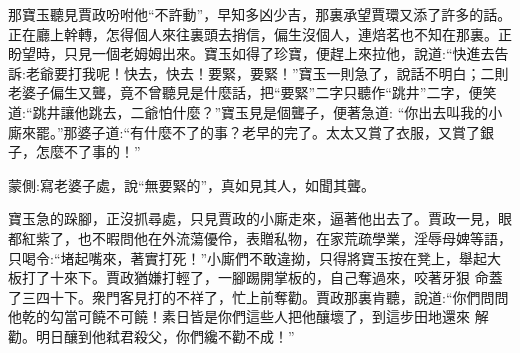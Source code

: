 \begin{parag}
    那寶玉聽見賈政吩咐他“不許動”，早知多凶少吉，那裏承望賈環又添了許多的話。正在廳上幹轉，怎得個人來往裏頭去捎信，偏生沒個人，連焙茗也不知在那裏。正盼望時，只見一個老姆姆出來。寶玉如得了珍寶，便趕上來拉他，說道:“快進去告訴:老爺要打我呢！快去，快去！要緊，要緊！”寶玉一則急了，說話不明白；二則老婆子偏生又聾，竟不曾聽見是什麼話，把“要緊”二字只聽作“跳井”二字，便笑道:“跳井讓他跳去，二爺怕什麼？”寶玉見是個聾子，便著急道: “你出去叫我的小廝來罷。”那婆子道:“有什麼不了的事？老早的完了。太太又賞了衣服，又賞了銀子，怎麼不了事的！”\begin{note}蒙側:寫老婆子處，說“無要緊的”，真如見其人，如聞其聾。\end{note}
\end{parag}


\begin{parag}
    寶玉急的跺腳，正沒抓尋處，只見賈政的小廝走來，逼著他出去了。賈政一見，眼都紅紫了，也不暇問他在外流蕩優伶，表贈私物，在家荒疏學業，淫辱母婢等語，只喝令:“堵起嘴來，著實打死！”小廝們不敢違拗，只得將寶玉按在凳上，舉起大板打了十來下。賈政猶嫌打輕了，一腳踢開掌板的，自己奪過來，咬著牙狠 命蓋了三四十下。衆門客見打的不祥了，忙上前奪勸。賈政那裏肯聽，說道:“你們問問他乾的勾當可饒不可饒！素日皆是你們這些人把他釀壞了，到這步田地還來 解勸。明日釀到他弒君殺父，你們纔不勸不成！”
\end{parag}



